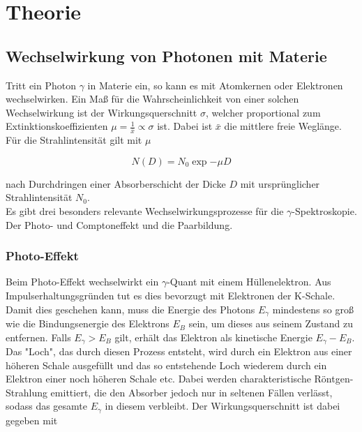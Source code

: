 \section{Theorie}
\label{sec:Theorie}

\subsection{Wechselwirkung von Photonen mit Materie}

Tritt ein Photon $\gamma$ in Materie ein, so kann es mit Atomkernen oder Elektronen wechselwirken. Ein Maß für die Wahrscheinlichkeit von 
einer solchen Wechselwirkung ist der Wirkungsquerschnitt $\sigma$, welcher proportional zum Extinktionskoeffizienten $\mu = \frac{1}{\bar{x}} \propto \sigma$
ist. Dabei ist $\bar{x}$ die mittlere freie Weglänge. Für die Strahlintensität gilt mit $\mu$

\begin{equation}
    N\left(D\right) = N_0 \exp{-\mu D}
    \label{eqn:Strahl}
\end{equation}

nach Durchdringen einer Absorberschicht der Dicke $D$ mit ursprünglicher Strahlintensität $N_0$.\\

Es gibt drei besonders relevante Wechselwirkungsprozesse für die $\gamma$-Spektroskopie. Der Photo- und Comptoneffekt und die Paarbildung.

\subsubsection{Photo-Effekt}

Beim Photo-Effekt wechselwirkt ein $\gamma$-Quant mit einem Hüllenelektron. Aus Impulserhaltungsgründen tut es dies bevorzugt mit Elektronen der 
K-Schale. Damit dies geschehen kann, muss die Energie des Photons $E_\gamma$ mindestens so groß wie die Bindungsenergie des Elektrons $E_B$ sein, 
um dieses aus seinem Zustand zu entfernen. Falls $E_\gamma > E_B$ gilt, erhält das Elektron als kinetische Energie $E_\gamma - E_B$. Das "Loch", 
das durch diesen Prozess entsteht, wird durch ein Elektron aus einer höheren Schale ausgefüllt und das so entstehende Loch wiederem durch ein 
Elektron einer noch höheren Schale etc. Dabei werden charakteristische Röntgen-Strahlung emittiert, die den Absorber jedoch nur in seltenen 
Fällen verlässt, sodass das gesamte $E_\gamma$ in diesem verbleibt. Der Wirkungsquerschnitt ist dabei gegeben mit 

